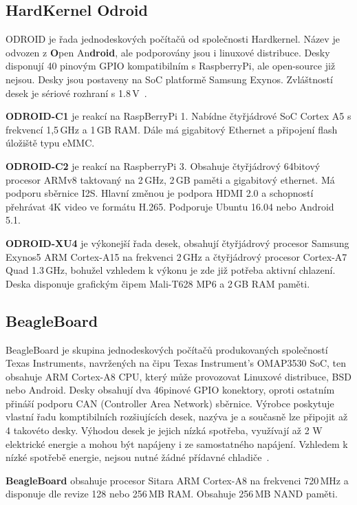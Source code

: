 \subsection{HardKernel Odroid}
	\label{KapKernel}
ODROID je řada jednodeskových počítačů od společnosti Hardkernel. Název je odvozen z \textbf{O}pen An\textbf{droid}, ale podporovány jsou i linuxové distribuce. Desky disponují 40 pinovým GPIO kompatibilním s RaspberryPi, ale open-source již nejsou. Desky jsou postaveny na SoC platformě Samsung Exynos. Zvláštností desek je sériové rozhraní s 1.8\,V~\cite{HardKernel}.
	
	\textbf{ODROID-C1} je reakcí na RaspBerryPi 1. Nabídne čtyřjádrové SoC Cortex A5 s frekvencí 1,5\,GHz a 1\,GB RAM. Dále má gigabitový Ethernet a připojení flash úložiště typu eMMC. 

	\textbf{ODROID-C2} je reakcí na RaspberryPi 3. Obsahuje čtyřjádrový 64bitový procesor ARMv8 taktovaný na 2\,GHz, 2\,GB paměti a gigabitový ethernet. Má podporu sběrnice I2S. Hlavní změnou je podpora HDMI 2.0 a schopností přehrávat 4K video ve formátu H.265. Podporuje Ubuntu 16.04 nebo Android 5.1. 
	
	\textbf{ODROID-XU4} je výkonejší řada desek, obsahují čtyřjádrový procesor Samsung Exynos5 ARM Cortex-A15 na frekvenci 2\,GHz a čtyřjádrový procesor Cortex-A7 Quad 1.3\,GHz, bohužel vzhledem k výkonu je zde již potřeba aktivní chlazení. Deska disponuje grafickým čipem Mali-T628 MP6 a 2\,GB RAM paměti.

	
\subsection{BeagleBoard }
BeagleBoard je skupina jednodeskových počítačů produkovaných společností Texas Instruments, navržených na čipu Texas Instrument's OMAP3530 SoC, ten obsahuje ARM Cortex-A8 CPU, který může provozovat Linuxové distribuce, BSD nebo Android. Desky obsahují dva 46pinové GPIO konektory, oproti ostatním přináší podporu CAN (Controller Area Network) sběrnice. Výrobce poskytuje vlastní řadu komptibilních rozšiujících desek, nazýva je  a současně lze připojit až 4 takovéto desky. Výhodou desek je jejich nízká spotřeba, využívají až 2 W elektrické energie a mohou být napájeny i ze samostatného napájení. Vzhledem k nízké spotřebě energie, nejsou nutné žádné přídavné chladiče~\cite{BeagleBone}.

\textbf{BeagleBoard} obsahuje procesor Sitara ARM Cortex-A8 na frekvenci 720\,MHz a disponuje dle revize 128 nebo 256\,MB RAM. Obsahuje 256\,MB NAND paměti.

